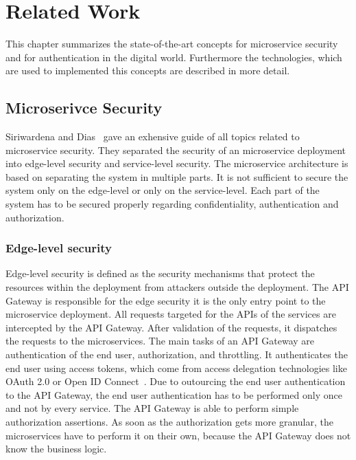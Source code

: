 \chapter{Related Work}
\label{cha:Related_Work}
This chapter summarizes the state-of-the-art concepts for microservice security and for authentication in the digital world.
Furthermore the technologies, which are used to implemented this concepts are described in more detail.

\section{Microserivce Security}
Siriwardena and Dias~\cite{dias2020microservices} gave an exhensive guide of all topics related to microservice security. 
They separated the security of an microservice deployment into edge-level security and service-level security.
The microservice architecture is based on separating the system in multiple parts.
It is not sufficient to secure the system only on the edge-level or only on the service-level.
Each part of the system has to be secured properly regarding confidentiality, authentication and authorization.

\subsection{Edge-level security}
Edge-level security is defined as the security mechanisms that protect the resources within the deployment from attackers outside the deployment.
The API Gateway is responsible for the edge security it is the only entry point to the microservice deployment.
All requests targeted for the APIs of the services are intercepted by the API Gateway.
After validation of the requests, it dispatches the requests to the microservices.
The main tasks of an API Gateway are authentication of the end user, authorization, and throttling.
It authenticates the end user using access tokens, which come from access delegation technologies like OAuth 2.0 or Open ID Connect~\cite{siriwardena2014advanced}.
Due to outourcing the end user authentication to the API Gateway, the end user authentication has to be performed only once and not by every service.
The API Gateway is able to perform simple authorization assertions. 
As soon as the authorization gets more granular, the microservices have to perform it on their own, because the API Gateway does not know the business logic.

